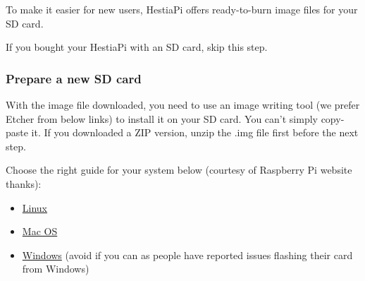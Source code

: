 To make it easier for new users, HestiaPi offers ready-to-burn image files for your SD card.

If you bought your HestiaPi with an SD card, skip this step.


\subsubsection{Prepare a new SD card}

With the image file downloaded, you need to use an image writing tool (we prefer Etcher from below links) to install it on your SD card. You can't simply copy-paste it. If you downloaded a ZIP version, unzip the .img file first before the next step.

Choose the right guide for your system below (courtesy of Raspberry Pi website  thanks):

\begin{itemize}
\item \href{http://www.raspberrypi.org/documentation/installation/installing-images/linux.md}{Linux}
\item \href{http://www.raspberrypi.org/documentation/installation/installing-images/mac.md}{Mac OS}
\item \href{http://www.raspberrypi.org/documentation/installation/installing-images/windows.md}{Windows} (avoid if you can as people have reported issues flashing their card from Windows)
\end{itemize}

